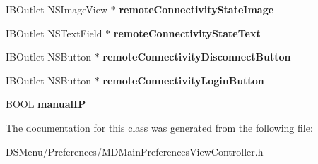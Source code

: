 \begin{DoxyCompactItemize}
\item 
\hypertarget{interface_m_d_main_preferences_view_controller_a367562bf10e87dfeb191aef3316d5380}{I\-B\-Outlet N\-S\-Image\-View $\ast$ {\bfseries remote\-Connectivity\-State\-Image}}\label{interface_m_d_main_preferences_view_controller_a367562bf10e87dfeb191aef3316d5380}

\item 
\hypertarget{interface_m_d_main_preferences_view_controller_aa0f13db10c25ea93e52698a129d6dbfd}{I\-B\-Outlet N\-S\-Text\-Field $\ast$ {\bfseries remote\-Connectivity\-State\-Text}}\label{interface_m_d_main_preferences_view_controller_aa0f13db10c25ea93e52698a129d6dbfd}

\item 
\hypertarget{interface_m_d_main_preferences_view_controller_acc45af415bc61d472d847587baf745e6}{I\-B\-Outlet N\-S\-Button $\ast$ {\bfseries remote\-Connectivity\-Disconnect\-Button}}\label{interface_m_d_main_preferences_view_controller_acc45af415bc61d472d847587baf745e6}

\item 
\hypertarget{interface_m_d_main_preferences_view_controller_ac1330a8cc7feec7c7f20276d418a00ef}{I\-B\-Outlet N\-S\-Button $\ast$ {\bfseries remote\-Connectivity\-Login\-Button}}\label{interface_m_d_main_preferences_view_controller_ac1330a8cc7feec7c7f20276d418a00ef}

\item 
\hypertarget{interface_m_d_main_preferences_view_controller_a2d92c5b6792860afa6e80c28f797b698}{B\-O\-O\-L {\bfseries manual\-I\-P}}\label{interface_m_d_main_preferences_view_controller_a2d92c5b6792860afa6e80c28f797b698}

\end{DoxyCompactItemize}


The documentation for this class was generated from the following file\-:\begin{DoxyCompactItemize}
\item 
D\-S\-Menu/\-Preferences/M\-D\-Main\-Preferences\-View\-Controller.\-h\end{DoxyCompactItemize}
